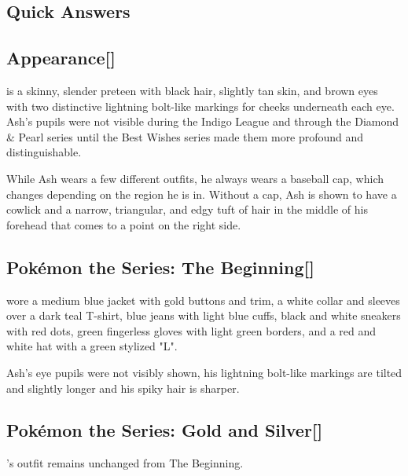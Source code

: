 \documentclass[a4paper,12pt]{article}
\begin{document}
\subsection*{Quick Answers}\n\n\subsection*{Appearance[]}\n\nAsh is a skinny, slender preteen with black hair, slightly tan skin, and brown eyes with two distinctive lightning bolt-like markings for cheeks underneath each eye. Ash's pupils were not visible during the Indigo League and through the Diamond & Pearl series until the Best Wishes series made them more profound and distinguishable.\\ \par \vspace{0.5cm}

While Ash wears a few different outfits, he always wears a baseball cap, which changes depending on the region he is in. Without a cap, Ash is shown to have a cowlick and a narrow, triangular, and edgy tuft of hair in the middle of his forehead that comes to a point on the right side.\\ \par \vspace{0.5cm}

\subsection*{Pokémon the Series: The Beginning[]}\n\nAsh wore a medium blue jacket with gold buttons and trim, a white collar and sleeves over a dark teal T-shirt, blue jeans with light blue cuffs, black and white sneakers with red dots, green fingerless gloves with light green borders, and a red and white hat with a green stylized "L".\\ \par \vspace{0.5cm}

Ash's eye pupils were not visibly shown, his lightning bolt-like markings are tilted and slightly longer and his spiky hair is sharper.\\ \par \vspace{0.5cm}

\subsection*{Pokémon the Series: Gold and Silver[]}\n\nAsh's outfit remains unchanged from The Beginning.\\ \par \vspace{0.5cm}
\end{document}
